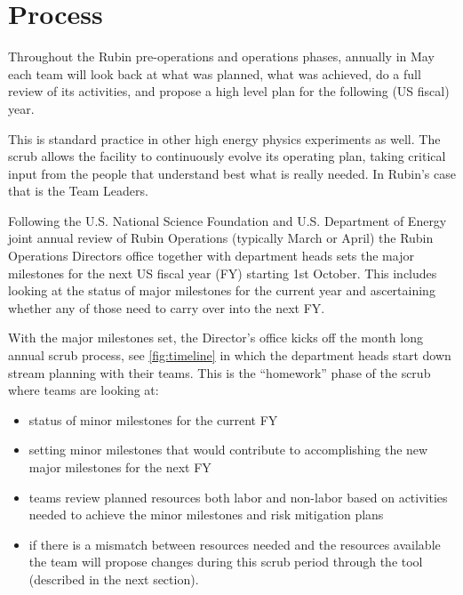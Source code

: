 \section{Process} \label{sec:process}


Throughout the Rubin pre-operations and operations phases, annually in May each team will look back at what was planned, what was achieved, do a full review of its activities, and propose a high level plan for the following (US fiscal) year.

This is standard practice in other high energy physics experiments as well. The scrub allows the facility to continuously evolve its operating plan, taking critical input from the people that understand best what is really needed. In Rubin’s case that is the Team Leaders.

Following the U.S. National Science Foundation and U.S. Department of Energy joint annual review of Rubin Operations (typically March or April) the Rubin Operations Directors office together with department heads sets the major milestones for the next US fiscal year (FY) starting 1st October. This includes looking at the status of major milestones for the current year and ascertaining whether any of those need to carry over into the next FY.

With the major milestones set, the Director’s office kicks off the month long annual scrub process, see \autoref{fig:timeline} in which the department heads start down stream planning with their teams. This is the “homework” phase of the scrub where teams are looking at:

\begin{itemize}
\item status of minor milestones for the current FY
\item setting minor milestones that would contribute to accomplishing the new major milestones for the next FY
\item teams review planned resources both labor and non-labor based on activities needed to achieve the minor milestones and risk mitigation plans 
\item if there is a mismatch between resources needed and the resources available the team will propose changes during this scrub period through the tool (described in the next section).

\end{itemize}


